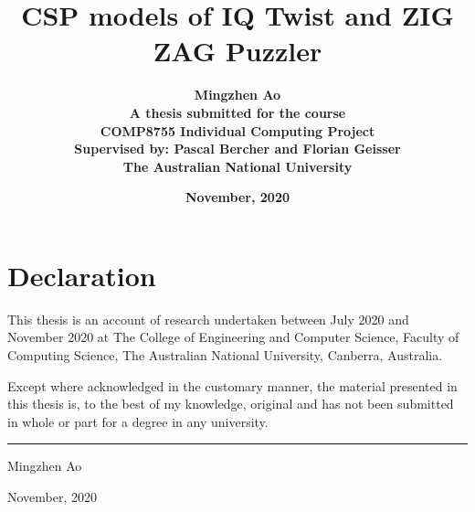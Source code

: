 \documentclass[11pt,a4paper]{report}
\begin{document}

\begin{titlepage}
\title{\textbf{CSP models of IQ Twist and ZIG ZAG Puzzler}\\[2cm]}
 \author{\textbf{Mingzhen Ao}\\[6cm]
 \textbf{A thesis submitted for the course}\\
 \textbf{COMP8755 Individual Computing Project} \\
 \textbf{Supervised by: Pascal Bercher and Florian Geisser}\\
 \textbf{The Australian National University}\\[1cm]}
 \date{\textbf{November, 2020}}
\maketitle
 \end{titlepage}
 
 \sloppy
 
\chapter*{Declaration}

This thesis is an account of research undertaken between July 2020 and 
November 2020 at The College of Engineering and Computer Science, Faculty of Computing Science, The Australian National University, Canberra, Australia.

Except where acknowledged in the customary manner, the material 
presented in this thesis is, to the best of my knowledge, original and 
has not been submitted in whole or part for a degree in any 
university.

\vspace{20mm}  %

\hspace{80mm}\rule{40mm}{.15mm}\par   %
\hspace{80mm} Mingzhen Ao\par
\hspace{80mm} November, 2020




\tableofcontents


\setcounter{page}{1}  %






\end{document}
